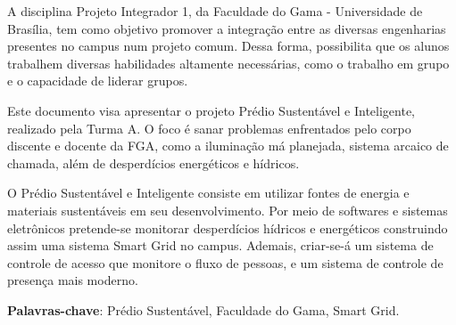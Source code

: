 \begin{resumo}
A disciplina Projeto Integrador 1, da Faculdade do Gama - Universidade de Brasília,
tem como objetivo promover a integração entre as diversas engenharias presentes no campus
num projeto comum. Dessa forma, possibilita que os alunos trabalhem diversas habilidades
altamente necessárias, como o trabalho em grupo e o capacidade de liderar grupos.

Este documento visa apresentar o projeto Prédio Sustentável e Inteligente,
realizado pela Turma A. O foco é sanar problemas enfrentados pelo corpo discente
e docente da FGA, como a iluminação má planejada, sistema arcaico de chamada,
além de desperdícios energéticos e hídricos.

O Prédio Sustentável e Inteligente consiste em utilizar fontes de energia e
materiais sustentáveis em seu desenvolvimento. Por meio de softwares e
sistemas eletrônicos pretende-se monitorar desperdícios hídricos e energéticos
construindo assim uma sistema Smart Grid no campus. Ademais, criar-se-á um
sistema de controle de acesso que monitore o fluxo de pessoas, e um sistema de
controle de presença mais moderno.

 \vspace{\onelineskip}

 \noindent
 \textbf{Palavras-chave}: Prédio Sustentável, Faculdade do Gama, Smart Grid.
\end{resumo}
